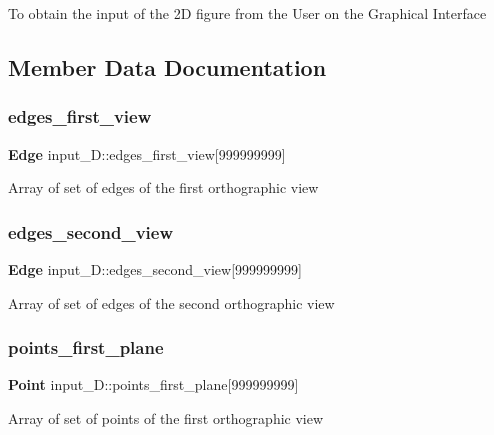 To obtain the input of the 2D figure from the User on the Graphical Interface 

\subsection{Member Data Documentation}
\mbox{\label{classinput__2_d_a27bd388ae0170c05696835b02919e23f}} 
\subsubsection{edges\+\_\+first\+\_\+view}
{\footnotesize\ttfamily \textbf{ Edge} input\+\_\+D\+::edges\+\_\+first\+\_\+view[999999999]\hspace{0.3cm}{\ttfamily [private]}}

Array of set of edges of the first orthographic view \mbox{\label{classinput__2_d_a93156687f64bf74b77e986f5fb26adc8}} 
\subsubsection{edges\+\_\+second\+\_\+view}
{\footnotesize\ttfamily \textbf{ Edge} input\+\_\+D\+::edges\+\_\+second\+\_\+view[999999999]\hspace{0.3cm}{\ttfamily [private]}}

Array of set of edges of the second orthographic view \mbox{\label{classinput__2_d_ac59cde250832947d4cf8e583cce6135a}} 
\subsubsection{points\+\_\+first\+\_\+plane}
{\footnotesize\ttfamily \textbf{ Point} input\+\_\+D\+::points\+\_\+first\+\_\+plane[999999999]\hspace{0.3cm}{\ttfamily [private]}}

Array of set of points of the first orthographic view \mbox{\label{classinput__2_d_a501f9a91c170bef271a0c16b46974e7d}} 

